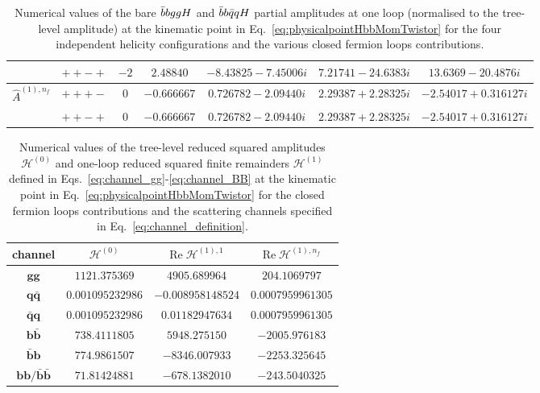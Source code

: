 \documentclass[main.tex]{subfiles}
\begin{document}
\begin{table}[t!]
\begin{tabularx}{1.0\textwidth}{|C{0.7}|C{0.8}|C{0.5}|C{1.2}|C{1.2}|C{1.3}|C{1.3}|}
                 & $++-+$ & $ -2 $ & $ 2.48840$ & $ -8.43825 - 7.45006 i$ & $ 7.21741 - 24.6383 i$ & $ 13.6369 - 20.4876 i $ \\
\hline
$\hat A^{(1),n_f}$ & $+++-$ & $ 0$ & $ -0.666667$ & $ 0.726782 - 2.09440 i$ & $ 2.29387 + 2.28325 i$ & $ -2.54017 + 0.316127 i $ \\
                   & $++-+$ & $ 0$ & $ -0.666667$ & $ 0.726782 - 2.09440 i$ & $ 2.29387 + 2.28325 i$ & $ -2.54017 + 0.316127 i $ \\
\hline
\end{tabularx}
\caption{\label{tab:benchmarkbare1L} Numerical values of the bare $\bar{b}bggH$ and $\bar{b}b\bar{q}qH$ partial amplitudes at one loop (normalised to the tree-level amplitude) at the kinematic point in 
Eq.~\eqref{eq:physicalpointHbbMomTwistor} for the four independent helicity configurations and the various closed fermion loops contributions. }
\end{table}

\begin{table}[t!]
\centering
\begin{tabularx}{0.85\textwidth}{|C{0.7}|C{1.1}|C{1.1}|C{1.1}|}
\hline
channel & $\mathcal{H}^{(0)}$ & $\mathrm{Re}\;\mathcal{H}^{(1),1}$ & $\mathrm{Re}\;\mathcal{H}^{(1),n_f}$  \\
\hline
$\mathbf{gg}$       & $ 1121.375369 $    & $ 4905.689964$ & $ 204.1069797 $ \\
$\mathbf{q\bar{q}}$ & $ 0.001095232986 $ & $ -0.008958148524$ & $ 0.0007959961305 $ \\
$\mathbf{\bar{q}q}$ & $ 0.001095232986 $ & $ 0.01182947634$ & $ 0.0007959961305 $ \\
$\mathbf{b\bar{b}}$ & $ 738.4111805 $ & $ 5948.275150$ & $ -2005.976183 $ \\
$\mathbf{\bar{b}b}$ & $ 774.9861507 $ & $ -8346.007933$ & $ -2253.325645 $ \\
$\mathbf{bb}/\mathbf{\bar{b}\bar{b}}$ & $ 71.81424881 $  & $ -678.1382010$ & $ -243.5040325 $ \\
\hline
\end{tabularx}
\caption{\label{tab:benchmarkfinremsq1L} Numerical values of the tree-level reduced squared amplitudes  $\mathcal{H}^{(0)}$ and 
one-loop reduced squared finite remainders $\mathcal{H}^{(1)}$ 
defined in Eqs.~\eqref{eq:channel_gg}-\eqref{eq:channel_BB} at the kinematic point in 
Eq.~\eqref{eq:physicalpointHbbMomTwistor} for  the closed fermion loops contributions and the scattering channels specified in Eq.~\eqref{eq:channel_definition}.}
\end{table}
\end{document}
